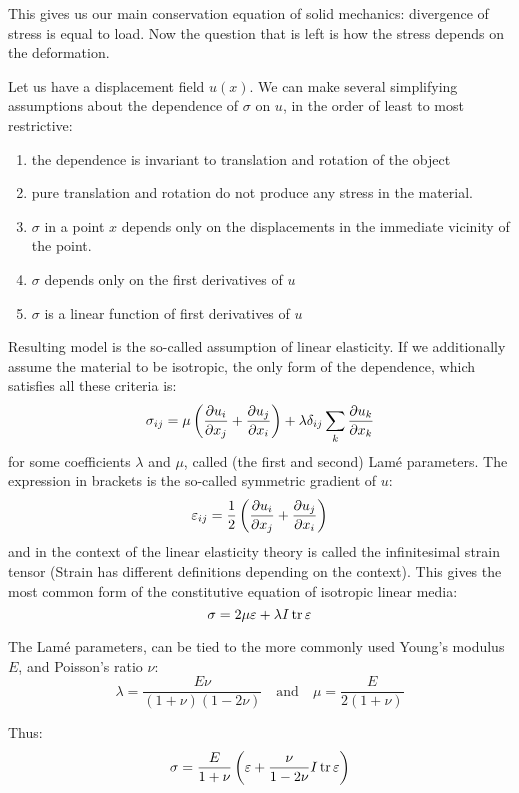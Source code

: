 \documentclass[12pt]{article}
\begin{document}
This gives us our main conservation equation of solid mechanics: divergence of stress is equal to load. Now the question that is left is how the stress depends on the deformation.

Let us have a displacement field $u(x)$. We can make several simplifying assumptions about the dependence of $\sigma$ on $u$, in the order of least to most restrictive:
\begin{enumerate}
    \item the dependence is invariant to translation and rotation of the object
    \item pure translation and rotation do not produce any stress in the material.
    \item $\sigma$ in a point $x$ depends only on the displacements in the immediate vicinity of the point.
    \item $\sigma$ depends only on the first derivatives of $u$
    \item $\sigma$ is a linear function of first derivatives of $u$
\end{enumerate}
Resulting model is the so-called assumption of linear elasticity. If we additionally assume the material to be isotropic, the only form of the dependence, which satisfies all these criteria is:
\[\sigma_{ij} = \mu\left(\frac{\partial u_i}{\partial x_j}+\frac{\partial u_j}{\partial x_i}\right) + \lambda\delta_{ij}\sum_k\frac{\partial u_k}{\partial x_k}\]
for some coefficients $\lambda$ and $\mu$, called (the first and second) Lam\'e parameters. The expression in brackets is the so-called symmetric gradient of $u$:
\[\varepsilon_{ij} = \frac{1}{2}\left(\frac{\partial u_i}{\partial x_j}+\frac{\partial u_j}{\partial x_i}\right)\]
and in the context of the linear elasticity theory is called the infinitesimal strain tensor (Strain has different definitions depending on the context). This gives the most common form of the constitutive equation of isotropic linear media:
\[\sigma = 2\mu\varepsilon + \lambda I \operatorname{tr}{\varepsilon}\]

The Lam\'e parameters, can be tied to the more commonly used Young's modulus $E$, and Poisson's ratio $\nu$:
\[\lambda = \frac{E\nu}{(1+\nu)(1-2\nu)}\quad\text{and}\quad\mu=\frac{E}{2(1+\nu)}\]

Thus:
\[\sigma = \frac{E}{1+\nu}\left(\varepsilon + \frac{\nu}{1-2\nu} I \operatorname{tr}{\varepsilon}\right)\]
\end{document}
